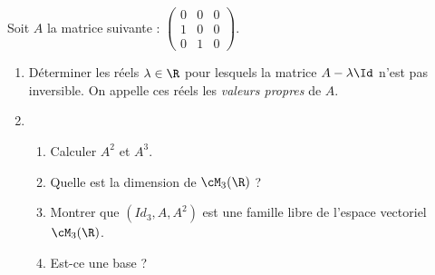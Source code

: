 \begin{exercice}
Soit $A$ la matrice suivante : 
$\left(\begin{array}{ccc}
0&0&0\\
1&0&0\\
0&1&0
\end{array}
\right).$
\begin{enumerate}
\item Déterminer les réels $\lambda\in \R$ pour lesquels la matrice $A-\lambda \Id$ n'est pas  inversible. On appelle ces réels les \emph{valeurs propres} de $A$. 
\item
\begin{enumerate}
\item  Calculer $A^2$ et $A^3$. 
\item Quelle est la dimension de $\cM_3(\R)$ ? 
\item Montrer que $(Id_3, A, A^2)$ est une famille libre de l'espace vectoriel $\cM_3(\R)$.
\item Est-ce une base ? 
\end{enumerate}


\end{enumerate}
\end{exercice}
